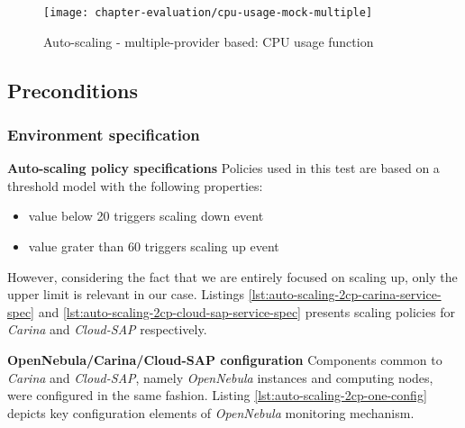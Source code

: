 \begin{figure}[!ht]
  \begin{center}
    \texttt{[image: chapter-evaluation/cpu-usage-mock-multiple]}
  \end{center}
  \caption{Auto-scaling - multiple-provider based: CPU usage function}
  \label{fig:auto-scaling-2cp-cpu-usage-function}
\end{figure}


\subsection*{Preconditions}
\subsubsection*{Environment specification}
\begin{asparaenum}
  \item[\textbf{Auto-scaling policy specifications}] Policies used in this test are based on a threshold model with the following properties:
  \begin{itemize}
   \item value below 20 triggers scaling down event
   \item value grater than 60 triggers scaling up event
  \end{itemize}
  However, considering the fact that we are entirely focused on scaling up, only the upper limit is relevant in our case. Listings \ref{lst:auto-scaling-2cp-carina-service-spec} and \ref{lst:auto-scaling-2cp-cloud-sap-service-spec} presents scaling policies for \emph{Carina} and \emph{Cloud-SAP} respectively.
  
  
  
  
  \item[\textbf{OpenNebula/Carina/Cloud-SAP configuration}] 
  Components common to \emph{Carina} and \emph{Cloud-SAP}, namely \emph{OpenNebula} instances and computing nodes, were configured in the same fashion. Listing \ref{lst:auto-scaling-2cp-one-config} depicts key configuration elements of \emph{OpenNebula} monitoring mechanism.
  

\end{asparaenum}
